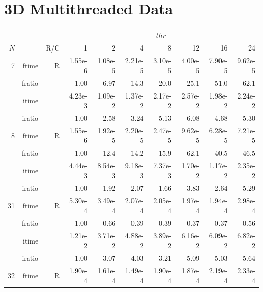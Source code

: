 \documentclass[a4paper]{article}
\begin{document}
\clearpage


\section{3D Multithreaded Data}\label{App:3Dthr}


\begin{table}[!htbp]
\begin{center}
\begin{small}
\begin{tabular}{|r|r|r|r|r|r|r|r|r|r|}
\hline 
     \multicolumn{3}{|c|}{ } & \multicolumn{7}{c|}{$thr$} \\ \hline
    $N$  & & R/C  & 1           & 2    & 4    & 8    & 12   & 16    & 24  \\ \hline\hline
    7  & ftime & R  &  1.55e-6 &   1.08e-5 &   2.21e-5 &   3.10e-5 &   4.00e-5 &   7.90e-5 &   9.62e-5     \\ 
    & fratio & &       1.00 &   6.97 &   14.3 &   20.0 &   25.1 &   51.0 &   62.1    \\ 
     & itime & &       4.23e-3 &   1.09e-2 &   1.37e-2 &   2.17e-2 &   2.57e-2 &   1.98e-2 &   2.24e-2       \\ 
     & iratio & &      1.00 &   2.58 &   3.24 &   5.13 &   6.08 &   4.68 &   5.30         \\ \hline 
    8  & ftime & R  &  1.55e-6 &   1.92e-5 &   2.20e-5 &   2.47e-5 &   9.62e-5 &   6.28e-5 &   7.21e-5     \\ 
      & fratio & &     1.00 &   12.4 &   14.2 &   15.9 &   62.1 &   40.5 &   46.5      \\ 
     & itime & &       4.44e-3 &   8.54e-3 &   9.18e-3 &   7.37e-3 &   1.70e-2 &   1.17e-2 &   2.35e-2        \\ 
     & iratio & &      1.00 &   1.92 &   2.07 &   1.66 &   3.83 &   2.64 &   5.29        \\ \hline 
   31  & ftime & R  &  5.30e-4 &   3.49e-4 &   2.07e-4 &   2.05e-4 &   1.97e-4 &   1.94e-4 &   2.98e-4   \\ 
      & fratio & &     1.00 &   0.66 &   0.39 &   0.39 &   0.37 &   0.37 &   0.56       \\ 
     & itime & &       1.21e-2 &   3.71e-2 &   4.88e-2 &   3.89e-2 &   6.16e-2 &   6.09e-2 &   6.82e-2       \\ 
     & iratio & &      1.00 &   3.07 &   4.03 &   3.21 &   5.09 &   5.03 &   5.64       \\ \hline 
   32  & ftime & R  &  1.90e-4 &   1.61e-4 &   1.49e-4 &   1.90e-4 &   1.87e-4 &   2.19e-4 &   2.33e-4    \\ 

\end{tabular}
\end{small}
\end{center}
\end{table}
\end{document}
